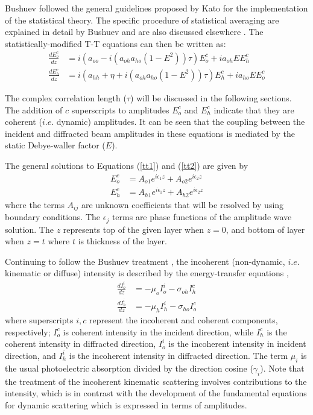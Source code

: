Bushuev followed the general guidelines proposed by Kato \cite{Kato1,Kato2} for the implementation of the statistical theory.  The specific procedure of statistical averaging are explained in detail by Bushuev \cite{Bushuev1,Bushuev2} and are also discussed elsewhere \cite{Ming1,An1,Punegov15,Punegov12,Punegov7,Punegov2,Punegov13,Punegov1,Punegov9,Authier1}.  The statistically-modified T-T equations can then be written as:
\begin{align}
\frac{dE^c_o}{dz}&=i (a_{oo} - i  (a_{oh}a_{ho}(1-E^2)) \tau)E_o^c + i a_{oh} EE^c_h\label{tt1}\\
\frac{dE^c_h}{dz}&=i (a_{hh} + \eta +i(a_{oh}a_{ho}(1-E^2)) \tau) E^c_h +i a_{ho} E E^c_o\label{tt2}
\end{align}

The complex correlation length ($\tau$) will be discussed in the following sections.  The addition of $c$ superscripts to amplitudes $E^c_o$ and $E^c_h$ indicate that they are coherent ($i.e.$ dynamic) amplitudes.  It can be seen that the coupling between the incident and diffracted beam amplitudes in these equations is mediated by the static Debye-waller factor ($E$).

The general solutions to Equations (\ref{tt1}) and (\ref{tt2}) are given by
\begin{align}
E_o^c &= A_{o1} e^{i \epsilon_1 z} + A_{o2} e^{i \epsilon_2 z } \label{sol1}\\
E_h^c &=  A_{h1} e^{i \epsilon_1 z} +  A_{h2} e^{i \epsilon_2 z }\label{sol2}
\end{align}
where the terms $A_{ij}$ are unknown coefficients that will be resolved by using boundary conditions.  The $\epsilon_j$ terms are phase functions of the amplitude wave solution.  The $z$ represents top of the given layer when $z=0$, and bottom of layer when $z=t$ where $t$ is thickness of the layer.

Continuing to follow the Bushuev treatment \cite{Bushuev1,Bushuev2}, the incoherent (non-dynamic, $i.e.$ kinematic or diffuse) intensity is described by the energy-transfer equations \cite{KatoI},
\begin{align}
\frac{dI^i_o}{dz} &=-\mu_o I^i_o-\sigma_{oh} I^c_{h}\\
\frac{dI^i_h}{dz} &=-\mu_h I^i_h-\sigma_{ho} I^c_{o}
\end{align}
where superscripts $i,c$ represent the incoherent and coherent components, respectively; $I_o^c$ is coherent intensity in the incident direction, while $I_h^c$ is the coherent intensity in diffracted direction, $I_o^i$ is the incoherent intensity in incident direction, and $I_h^i$ is the incoherent intensity in diffracted direction.  The term $\mu_i$ is the usual photoelectric absorption divided by the direction cosine ($\gamma_i$).  Note that the treatment of the incoherent kinematic scattering involves contributions to the intensity, which is in contrast with the development of the fundamental equations for dynamic scattering which is expressed in terms of amplitudes.

